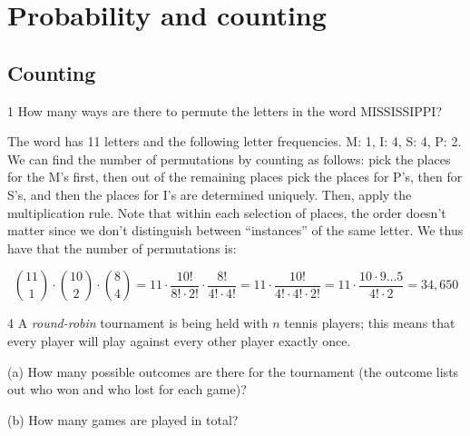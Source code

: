 
\chapter{Probability and counting}

\section{Counting}

\begin{exercise}{1}
    How many ways are there to permute the letters in the word MISSISSIPPI?
\end{exercise}

\begin{solution}

    The word has 11 letters and the following letter frequencies. 
    M: 1, I: 4, S: 4, P: 2.
    We can find the number of permutations by counting as follows: pick the places for the M's first, then out of the remaining places pick the places for P's, then for S's, and then the places for I's are determined uniquely.
    Then, apply the multiplication rule.
    Note that within each selection of places, the order doesn't matter since we don't distinguish between ``instances'' of the same letter.
    We thus have that the number of permutations is:

    \[\binom{11}{1} \cdot \binom{10}{2} \cdot \binom{8}{4} = 11 \cdot \frac{10!}{8! \cdot 2!} \cdot \frac{8!}{4! \cdot 4!} = 11 \cdot \frac{10!}{4! \cdot 4! \cdot 2!} = 11 \cdot \frac{10\cdot 9 \ldots 5}{4! \cdot 2} = 34,650\]
\end{solution}

\begin{exercise}{4}
    A \textit{round-robin} tournament is being held with $n$ tennis players; this means that every player will play against every other player exactly once.

    (a) How many possible outcomes are there for the tournament (the outcome lists out who won and who lost for each game)?

    (b) How many games are played in total?
\end{exercise}

